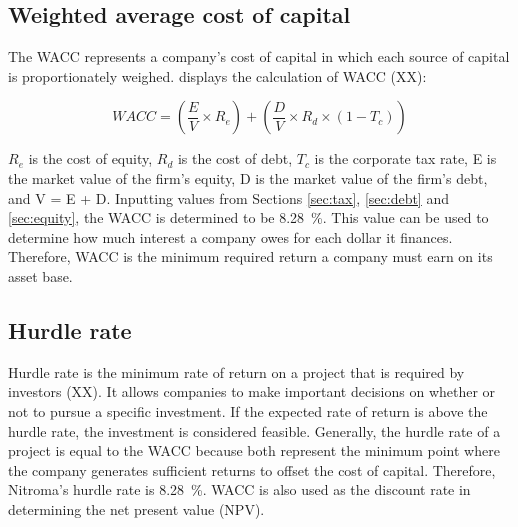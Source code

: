 \subsection{Weighted average cost of capital}
\label{sec:wacc}
The WACC represents a company’s cost of capital in which each source of capital is proportionately weighed.  displays the calculation of WACC (XX):

\begin{equation}
\label{eqn:wacc}
    WACC=\left(\frac{E}{V}\times R_{e}\right)+\left(\frac{D}{V}\times R_{d}\times (1-T_{c})\right)
\end{equation}

$R_{e}$ is the cost of equity, $R_{d}$ is the cost of debt, $T_{c}$ is the corporate tax rate, E is the market value of the firm’s equity, D is the market value of the firm’s debt, and V = E + D. Inputting values from Sections \ref{sec:tax}, \ref{sec:debt} and \ref{sec:equity}, the WACC is determined to be \SI{8.28}{\percent}. This value can be used to determine how much interest a company owes for each dollar it finances. Therefore, WACC is the minimum required return a company must earn on its asset base. 

\subsection{Hurdle rate}
Hurdle rate is the minimum rate of return on a project that is required by investors (XX). It allows companies to make important decisions on whether or not to pursue a specific investment. If the expected rate of return is above the hurdle rate, the investment is considered feasible. Generally, the hurdle rate of a project is equal to the WACC because both represent the minimum point where the company generates sufficient returns to offset the cost of capital. Therefore, Nitroma's hurdle rate is \SI{8.28}{\percent}. WACC is also used as the discount rate in determining the net present value (NPV).